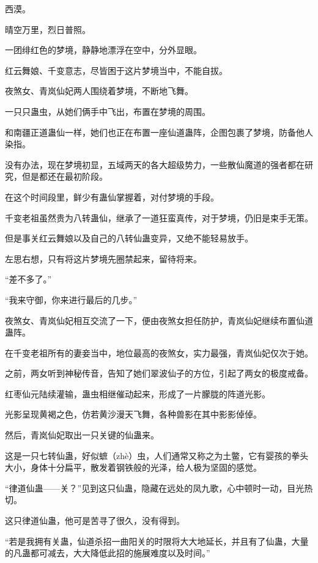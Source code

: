 
\begin{this_body}

西漠。

晴空万里，烈日普照。

一团绯红色的梦境，静静地漂浮在空中，分外显眼。

红云舞娘、千变意志，尽皆困于这片梦境当中，不能自拔。

夜煞女、青岚仙妃两人围绕着梦境，不断地飞舞。

一只只蛊虫，从她们俩手中飞出，布置在梦境的周围。

和南疆正道蛊仙一样，她们也正在布置一座仙道蛊阵，企图包裹了梦境，防备他人染指。

没有办法，现在梦境初显，五域两天的各大超级势力，一些散仙魔道的强者都在研究，但是都还在最初阶段。

在这个时间段里，鲜少有蛊仙掌握着，对付梦境的手段。

千变老祖虽然贵为八转蛊仙，继承了一道狂蛮真传，对于梦境，仍旧是束手无策。

但是事关红云舞娘以及自己的八转仙蛊变异，又绝不能轻易放手。

左思右想，只有将这片梦境先圈禁起来，留待将来。

“差不多了。”

“我来守御，你来进行最后的几步。”

夜煞女、青岚仙妃相互交流了一下，便由夜煞女担任防护，青岚仙妃继续布置仙道蛊阵。

在千变老祖所有的妻妾当中，地位最高的夜煞女，实力最强，青岚仙妃仅次于她。

之前，两女听到神秘传音，告知了她们翠波仙子的方位，引起了两女的极度戒备。

红枣仙元陆续灌输，蛊虫相继催动起来，形成了一片朦胧的阵道光影。

光影呈现黄褐之色，仿若黄沙漫天飞舞，各种兽影在其中影影倬倬。

然后，青岚仙妃取出一只关键的仙蛊来。

这是一只七转仙蛊，好似蟅（zhè）虫，人们通常又称之为土鳖，它有婴孩的拳头大小，身体十分扁平，散发着钢铁般的光泽，给人极为坚固的感觉。

“律道仙蛊——关？”见到这只仙蛊，隐藏在远处的凤九歌，心中顿时一动，目光热切。

这只律道仙蛊，他可是苦寻了很久，没有得到。

“若是我拥有关蛊，仙道杀招一曲阳关的时限将大大地延长，并且有了仙蛊，大量的凡蛊都可减去，大大降低此招的施展难度以及时间。”


\end{this_body}
